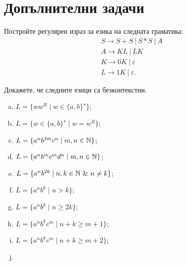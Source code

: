 \section{Допълнителни задачи}

\begin{problem}
  Постройте регулярен израз за езика на следната граматика:
  \begin{align*}
    & S \to S + S\ |\ S * S\ |\ A\\
    & A \to KL\ |\ LK\\
    & K \to 0K\ |\ \varepsilon\\
    & L \to 1K\ |\ \varepsilon.
  \end{align*}
\end{problem}

\begin{problem}
  Докажете, че следните езици са безконтекстни.
  \begin{enumerate}[a)]
  \item
    $L = \{ww^R \mid w \in \{a,b\}^\star\}$;
  \item
    $L = \{w \in \{a,b\}^\star \mid w = w^R\}$;
  \item
    $L = \{a^nb^{2m}c^{n} \mid m,n \in \mathbb{N}\}$;
  \item
    $L = \{a^nb^{m}c^{m}d^n \mid m,n \in \mathbb{N}\}$;
  \item
    $L = \{a^nb^{2k} \mid n,k \in \Nat\ \&\ n \neq k\}$;
  \item
    $L = \{a^nb^k \mid n > k\}$;
  \item
    $L = \{a^nb^k \mid n \geq 2k\}$;
  \item
    $L = \{a^nb^kc^m \mid n + k \geq m+1\}$;
  \item
    $L = \{a^nb^kc^m \mid n + k \geq m+2\}$;
  \item

\end{enumerate}
\end{problem}

